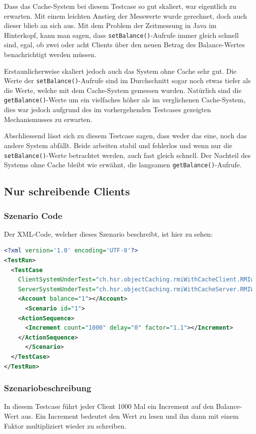 Dass das Cache-System bei diesem Testcase so gut ska\-liert, war eigentlich zu erwarten. Mit einem leichten An\-s\-tieg der Mess\-werte wurde gerechnet, doch auch dieser blieb an sich aus. Mit dem Pro\-blem der Zeit\-messung in Java im Hinter\-kopf, kann man sagen, dass \texttt{setBalance()}-Aufrufe immer gleich schnell sind, egal, ob zwei oder acht Clients über den neuen Betrag des Balance-Wertes benachrichtigt werden müssen.

Erstaunlicherweise skaliert jedoch auch das System ohne Cache sehr gut. Die Werte der \texttt{setBalance()}-Aufrufe sind im Durch\-schnitt sogar noch etwas tiefer als die Werte, welche mit dem Cache-System gemessen wurden. Natürlich sind die \texttt{getBalance()}-Werte um ein vielfaches höher als im verglichenen Cache-System, dies war jedoch aufgrund des im vorhergehenden Testcases gezeigten Mechanismusses zu erwarten.

Abschliessend lässt sich zu diesem Testcase sagen, dass weder das eine, noch das andere System abfällt. Beide arbeiten stabil und fehlerlos und wenn nur die \texttt{setBalance()}-Werte betrachtet werden, auch fast gleich schnell. Der Nachteil des Systems ohne Cache bleibt wie erwähnt, die langsamen \texttt{getBalance()}-Aufrufe.

\subsection{Nur schreibende Clients}
\subsubsection{Szenario Code}
Der XML-Code, welcher dieses Szenario beschreibt, ist hier zu sehen:
\begin{lstlisting}[language=XML, breaklines=true]
<?xml version='1.0' encoding='UTF-8'?>
<TestRun>
  <TestCase
    ClientSystemUnderTest="ch.hsr.objectCaching.rmiWithCacheClient.RMIwithCacheClientSystem"
    ServerSystemUnderTest="ch.hsr.objectCaching.rmiWithCacheServer.RMIWithCacheServerSystem">
    <Account balance="1"></Account>
      <Scenario id="1">
	<ActionSequence>
	  <Increment count="1000" delay="0" factor="1.1"></Increment>
	</ActionSequence>
      </Scenario>
  </TestCase>
</TestRun>
\end{lstlisting}
\subsubsection{Szenariobeschreibung}
In diesem Testcase führt jeder Client 1000 Mal ein Increment auf den Balance-Wert aus. Ein Increment bedeutet den Wert zu lesen und ihn dann mit einem Faktor multipliziert wieder zu schreiben. 

